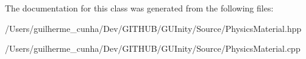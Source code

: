 The documentation for this class was generated from the following files\+:\begin{DoxyCompactItemize}
\item 
/\+Users/guilherme\+\_\+cunha/\+Dev/\+G\+I\+T\+H\+U\+B/\+G\+U\+Inity/\+Source/Physics\+Material.\+hpp\item 
/\+Users/guilherme\+\_\+cunha/\+Dev/\+G\+I\+T\+H\+U\+B/\+G\+U\+Inity/\+Source/Physics\+Material.\+cpp\end{DoxyCompactItemize}
